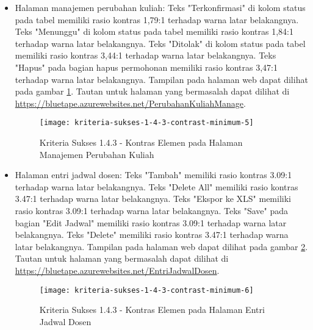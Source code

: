 \begin{itemize}
    \item Halaman manajemen perubahan kuliah: Teks "Terkonfirmasi" di kolom status pada tabel memiliki rasio kontras 1,79:1 terhadap warna latar belakangnya. Teks "Menunggu" di kolom status pada tabel memiliki rasio kontras 1,84:1 terhadap warna latar belakangnya. Teks "Ditolak" di kolom status pada tabel memiliki rasio kontras 3,44:1 terhadap warna latar belakangnya. Teks "Hapus" pada bagian hapus permohonan memiliki rasio kontras 3,47:1 terhadap warna latar belakangnya. Tampilan pada halaman web dapat dilihat pada gambar \ref{fig:1.4.3_contrast_minimum_5}. Tautan untuk halaman yang bermasalah dapat dilihat di \url{https://bluetape.azurewebsites.net/PerubahanKuliahManage}.
    \begin{figure}[H]
        \centering  
        \texttt{[image: kriteria-sukses-1-4-3-contrast-minimum-5]}  
        \caption[Kriteria Sukses 1.4.3 - Kontras Elemen pada Halaman Manajemen Perubahan Kuliah]{Kriteria Sukses 1.4.3 - Kontras Elemen pada Halaman Manajemen Perubahan Kuliah}
        \label{fig:1.4.3_contrast_minimum_5}  
    \end{figure} 

    \item Halaman entri jadwal dosen: Teks "Tambah" memiliki rasio kontras 3.09:1 terhadap warna latar belakangnya. Teks "Delete All" memiliki rasio kontras 3.47:1 terhadap warna latar belakangnya. Teks "Ekspor ke XLS" memiliki rasio kontras 3.09:1 terhadap warna latar belakangnya. Teks "Save" pada bagian "Edit Jadwal" memiliki rasio kontras 3.09:1 terhadap warna latar belakangnya. Teks "Delete" memiliki rasio kontras 3.47:1 terhadap warna latar belakangnya. Tampilan pada halaman web dapat dilihat pada gambar \ref{fig:1.4.3_contrast_minimum_6}. Tautan untuk halaman yang bermasalah dapat dilihat di \url{https://bluetape.azurewebsites.net/EntriJadwalDosen}.	
    \begin{figure}[H]
        \centering  
        \texttt{[image: kriteria-sukses-1-4-3-contrast-minimum-6]}  
        \caption[Kriteria Sukses 1.4.3 - Kontras Elemen pada Halaman Entri Jadwal Dosen]{Kriteria Sukses 1.4.3 - Kontras Elemen pada Halaman Entri Jadwal Dosen}
        \label{fig:1.4.3_contrast_minimum_6}  
    \end{figure} 
    

\end{itemize}
